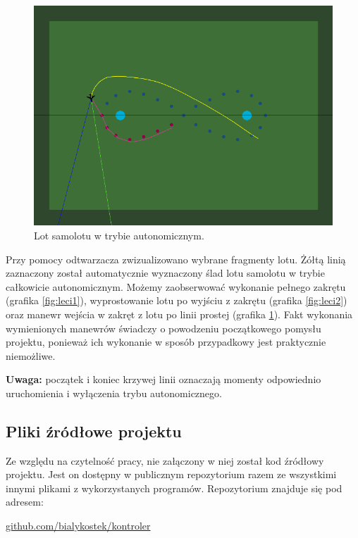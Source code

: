 \documentclass[12pt, a4paper]{article}
\begin{document}
 \begin{figure}[H]
    \centering
    \includegraphics[width=1\textwidth]{aileci3}
    \caption{Lot samolotu w trybie autonomicznym.}
    \label{fig:leci3}
\end{figure}

Przy pomocy odtwarzacza zwizualizowano wybrane fragmenty lotu. Żółtą linią zaznaczony został automatycznie wyznaczony ślad lotu samolotu w trybie całkowicie autonomicznym. Możemy zaobserwować wykonanie pełnego zakrętu (grafika \ref{fig:leci1}), wyprostowanie lotu po wyjściu z zakrętu (grafika \ref{fig:leci2}) oraz manewr wejścia w zakręt z lotu po linii prostej (grafika \ref{fig:leci3}). Fakt wykonania wymienionych manewrów świadczy o powodzeniu początkowego pomysłu projektu, ponieważ ich wykonanie w sposób przypadkowy jest praktycznie niemożliwe.

\textbf{Uwaga:} początek i koniec krzywej linii oznaczają momenty odpowiednio uruchomienia i wyłączenia trybu autonomicznego. 


\FloatBarrier



\subsection{Pliki źródłowe projektu}
Ze względu na czytelność pracy, nie załączony w niej został kod źródłowy projektu. Jest on dostępny w publicznym repozytorium razem ze wszystkimi innymi plikami z wykorzystanych programów. Repozytorium znajduje się pod adresem:

\begin{center}
\url{github.com/bialykostek/kontroler}
\end{center}
\end{document}
